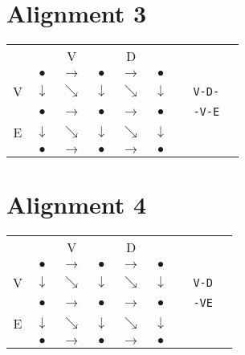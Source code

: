 \documentclass[landscape]{foils}
\begin{document}
\myNewSlide
\section*{Alignment 3}

{
\huge
\begin{center}
\begin{tabular}{cccccccp{1in}c}
   &              & V            &  & D & \\   
   & {\color{red} $\bullet$}      & {\color{red}$\rightarrow$}   & {\color{red} $\bullet$}        &   {\color{black}$\rightarrow$} & {\color{black}$\bullet$} \\
V  & {\color{black} $\downarrow$} & {\color{black}$\searrow$}    & {\color{red} $\downarrow$ } & {\color{black}$\searrow$}    & {\color{black} $\downarrow$ }  & & {\tt V-D-}\\
   & {\color{black} $\bullet$ }   & {\color{black}$\rightarrow$} & {\color{red}  $\bullet$ }   & {\color{red}$\rightarrow$} & {\color{red}  $\bullet$ } & & {\tt -V-E}\\   
E  & {\color{black} $\downarrow$} & {\color{black}$\searrow$}    & {\color{black} $\downarrow$ } & {\color{black}$\searrow$}    & {\color{red} $\downarrow$ }  \\
   & {\color{black} $\bullet$ }   & {\color{black}$\rightarrow$} & {\color{black}  $\bullet$ }   & {\color{black}$\rightarrow$} & {\color{red}  $\bullet$ } \\   
\end{tabular}
\end{center}
}


\myNewSlide
\section*{Alignment 4}

{
\huge
\begin{center}
\begin{tabular}{cccccccp{1in}c}
   &              & V            &  & D & \\   
   & {\color{red} $\bullet$}      & {\color{red}$\rightarrow$}   & {\color{red} $\bullet$}        &   {\color{black}$\rightarrow$} & {\color{black}$\bullet$} \\
V  & {\color{black} $\downarrow$} & {\color{black}$\searrow$}    & {\color{red} $\downarrow$ } & {\color{black}$\searrow$}    & {\color{black} $\downarrow$ }  & & {\tt V-D} \\
   & {\color{black} $\bullet$ }   & {\color{black}$\rightarrow$} & {\color{red}  $\bullet$ }   & {\color{black}$\rightarrow$} & {\color{black}  $\bullet$ } & & {\tt -VE}\\   
E  & {\color{black} $\downarrow$} & {\color{black}$\searrow$}    & {\color{black} $\downarrow$ } & {\color{red}$\searrow$}    & {\color{black} $\downarrow$ }  \\
   & {\color{black} $\bullet$ }   & {\color{black}$\rightarrow$} & {\color{black}  $\bullet$ }   & {\color{black}$\rightarrow$} & {\color{red}  $\bullet$ } \\   
\end{tabular}
\end{center}
}
\end{document}

